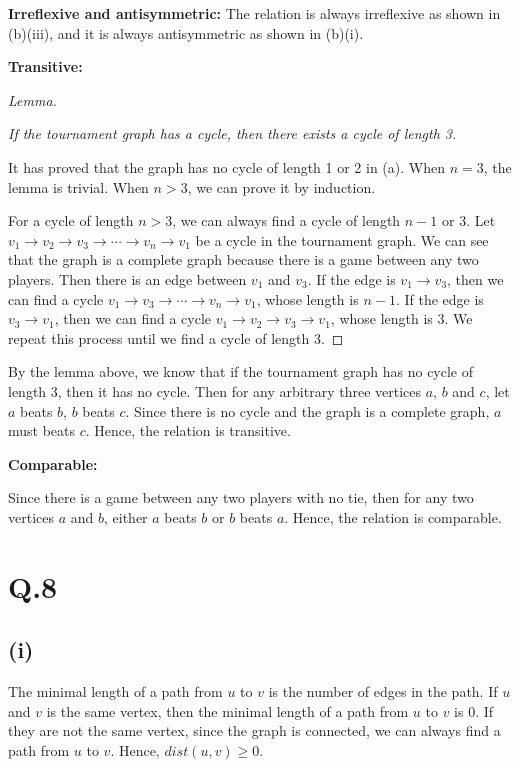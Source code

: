 \documentclass[a4paper,12pt]{article}
\begin{document}
\textbf{Irreflexive and antisymmetric:}
The relation is always irreflexive as shown in (b)(iii), and it is always antisymmetric as shown in (b)(i).

\textbf{Transitive:}
\begin{proof}[Lemma]
$ $

\textit{If the tournament graph has a cycle, then there exists a cycle of length 3.}

It has proved that the graph has no cycle of length 1 or 2 in (a).
When $n = 3$, the lemma is trivial.
When $n > 3$, we can prove it by induction.

For a cycle of length $n > 3$, we can always find a cycle of length $n-1$ or 3.
Let $v_1 \rightarrow v_2 \rightarrow v_3 \rightarrow \cdots \rightarrow v_n \rightarrow v_1$ be a cycle in the tournament graph.
We can see that the graph is a complete graph because there is a game between any two players.
Then there is an edge between $v_1$ and $v_3$.
If the edge is $v_1 \rightarrow v_3$, then we can find a cycle $v_1 \rightarrow v_3 \rightarrow \cdots \rightarrow v_n \rightarrow v_1$, whose length is $n-1$.
If the edge is $v_3 \rightarrow v_1$, then we can find a cycle $v_1 \rightarrow v_2 \rightarrow v_3 \rightarrow v_1$, whose length is 3.
We repeat this process until we find a cycle of length 3.
\end{proof}

By the lemma above, we know that if the tournament graph has no cycle of length 3, then it has no cycle.
Then for any arbitrary three vertices $a$, $b$ and $c$, let $a$ beats $b$, $b$ beats $c$.
Since there is no cycle and the graph is a complete graph, $a$ must beats $c$.
Hence, the relation is transitive.

\textbf{Comparable:}

Since there is a game between any two players with no tie, then for any two vertices $a$ and $b$, either $a$ beats $b$ or $b$ beats $a$.
Hence, the relation is comparable.

\section*{Q.8}

\subsection*{(i)}

The minimal length of a path from $u$ to $v$ is the number of edges in the path.
If $u$ and $v$ is the same vertex, then the minimal length of a path from $u$ to $v$ is 0.
If they are not the same vertex, since the graph is connected, we can always find a path from $u$ to $v$.
Hence, $dist(u,v) \geq 0$.
\end{document}
